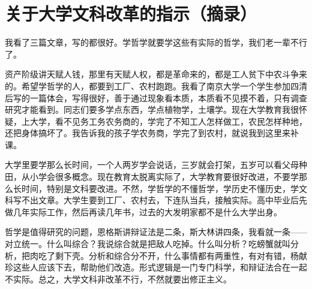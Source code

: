 \section[关于大学文科改革的指示（摘录）（一九六五年十月）]{关于大学文科改革的指示（摘录）}


我看了三篇文章，写的都很好。学哲学就要学这些有实际的哲学，我们老一辈不行了。

资产阶级讲天赋人钱，那里有天赋人权，都是革命来的，都是工人贫下中农斗争来的。希望学哲学的人，都要到工厂、农村跑跑。我看了南京大学一个学生参加四清后写的一篇体会，写得很好，善于通过现象看本质，本质看不见摸不着，只有调查研究才能看到。同志们要多学点东西，学点植物学，土壤学。现在大学教育我很怀疑，上大学，看不见务工务农务商的，学完了不知工人怎样做工，农民怎样种地，还把身体搞坏了。我告诉我的孩子学农务商，学完了到农村，就说我到这里来补课。

大学里要学那么长时间，一个人两岁学会说话，三岁就会打架，五岁可以看父母种田，从小学会很多概念。现在教育太脱离实际了，大学教育要很好改进，不要学那么长时间，特别是文科要改进。不然，学哲学的不懂哲学，学历史不懂历史，学文科写不出文章。大学生要到工厂、农村去，下连队当兵，接触实际。高中毕业后先做几年实际工作，然后再读几年书，过去的大发明家都不是什么大学出身。

哲学是值得研究的问题，恩格斯讲辩证法是二条，斯大林讲四条，我看就一条——对立统一。什么叫综合？我说综合就是把敌人吃掉。什么叫分析？吃螃蟹就叫分析，把肉吃了剩下壳。分析和综合分不开，什么事情都有两重性，有对有错，杨献珍这些人应该下去，帮助他们改造。形式逻辑是一门专门科学，和辩证法合在一起不实际。总之，大学文科非改革不行，不然就要出修正主义。


